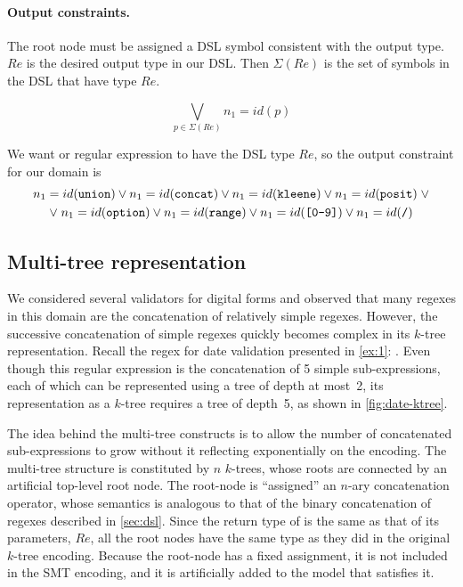 \paragraph{Output constraints.}  
The root node must be assigned a DSL symbol consistent with the output type. \(Re\) is the desired output type in our DSL. Then \(\Sigma(Re)\) is the set of symbols in the DSL that have type \(Re\).

\begin{equation}
    \bigvee_{p\in \Sigma(Re)} n_1 = id(p)
\end{equation}


\begin{example}
We want or regular expression to have the DSL type \(Re\), so the output constraint for our domain is
\begin{gather*}
    n_1 = id(\texttt{union}) \lor n_1 = id(\texttt{concat}) \lor n_1 = id(\texttt{kleene}) \lor n_1 = id(\texttt{posit}) \;\lor \\
    \lor\; n_1 = id(\texttt{option}) \lor n_1 = id(\texttt{range}) \lor n_1 = id(\texttt{[0-9]}) \lor n_1 = id(\texttt{/})
\end{gather*}
\end{example}

\subsection{Multi-tree representation}
We considered several validators for digital forms and observed that many regexes in this domain are the concatenation of relatively simple regexes. However, the successive concatenation of simple regexes quickly becomes complex in its \(k\)-tree representation.
%
Recall the regex for date validation presented in \autoref{ex:1}: .
%
Even though this regular expression is the concatenation of 5 simple sub-expressions, each of which can be represented using a tree of depth at most~2, its representation as a {\(k\)-tree} requires a tree of depth~5, as shown in \autoref{fig:date-ktree}.



The idea behind the multi-tree constructs is to allow the number of concatenated sub-expressions to grow without it reflecting exponentially on the encoding. The multi-tree structure is constituted by \(n\) \(k\)-trees, whose roots are connected by an artificial top-level root node. The root-node is ``assigned'' an \(n\)-ary concatenation operator, whose semantics is analogous to that of the binary concatenation of regexes described in \autoref{sec:dsl}. Since the return type of \Concat{} is the same as that of its parameters, \(Re\), all the root nodes have the same type as they did in the original \(k\)-tree encoding. %
Because the root-node has a fixed assignment, it is not included in the \ac{SMT} encoding, and it is artificially added to the model that satisfies it.

